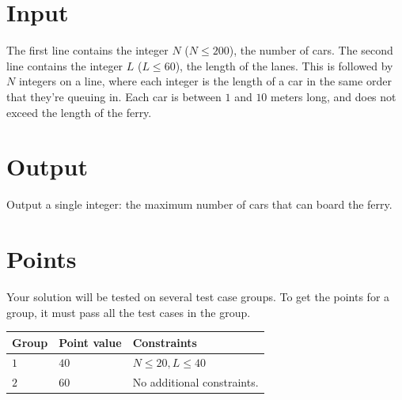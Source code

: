\section*{Input}
The first line contains the integer $N$ ($N \le 200$), the number of cars.
The second line contains the integer $L$ ($L \le 60$), the length of the lanes.
This is followed by $N$ integers on a line, where each integer is the length of a car in the same order that they're queuing in.
Each car is between $1$ and $10$ meters long, and does not exceed the length of the ferry.

\section*{Output}
Output a single integer: the maximum number of cars that can board the ferry.


\section*{Points}
Your solution will be tested on several test case groups.
To get the points for a group, it must pass all the test cases in the group.

\noindent
\begin{tabular}{| l | l | p{12cm} |}
  \hline
  \textbf{Group} & \textbf{Point value} & \textbf{Constraints} \\ \hline
  $1$    & $40$        & $N \le 20, L \le 40$ \\ \hline 
  $2$    & $60$        & No additional constraints. \\ \hline 
\end{tabular}

